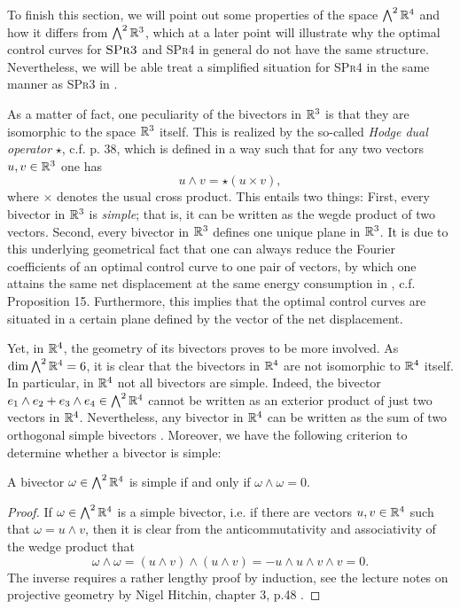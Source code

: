 To finish this section, we will point out some properties of the space $\bigwedge^2 \mathbb{R}^4$ and how it differs from $\bigwedge^2 \mathbb{R}^3$, which at a later point will illustrate why the optimal control curves for $\textsc{SPr3}$ and \textsc{SPr4} in general do not have the same structure. Nevertheless, we will be able treat a simplified situation for \textsc{SPr4} in the same manner as \textsc{SPr3} in \cite{Alouges2017}.

As a matter of fact, one peculiarity of the bivectors in $\mathbb{R}^3$ is that they are isomorphic to the space $\mathbb{R}^3$ itself. This is realized by the so-called \emph{Hodge dual operator} $\star$, c.f. \cite{Lounesto2006} p. 38, which is defined in a way such that for any two vectors $u,v \in \mathbb{R}^3$ one has
\begin{equation}
\label{eq: hodge star}
u \wedge v = \star(u \times v),
\end{equation}
where $\times$ denotes the usual cross product. This entails two things: First, every bivector in $\mathbb{R}^3$ is \emph{simple}; that is, it can be written as the wegde product of two vectors. Second, every bivector in $\mathbb{R}^3$ defines one unique plane in $\mathbb{R}^3$. It is due to this underlying geometrical fact that one can always reduce the Fourier coefficients of an optimal control curve to one pair of vectors, by which one attains the same net displacement at the same energy consumption in \cite{Alouges2017}, c.f. Proposition 15. Furthermore, this implies that the optimal control curves are situated in a certain plane defined by the vector of the net displacement.

Yet, in $\mathbb{R}^4$, the geometry of its bivectors proves to be more involved. As $\dim \bigwedge^2 \mathbb{R}^4 = 6$, it is clear that the bivectors in $\mathbb{R}^4$ are not isomorphic to $\mathbb{R}^4$ itself. In particular, in $\mathbb{R}^4$ not all bivectors are simple. Indeed, the bivector $e_1 \wedge e_2 + e_3 \wedge e_4 \in \bigwedge^2 \mathbb{R}^4$ cannot be written as an exterior product of just two vectors in $\mathbb{R}^4$. Nevertheless, any bivector in $\mathbb{R}^4$ can be written as the sum of two orthogonal simple bivectors \cite{Lounesto2006}. Moreover, we have the following criterion to determine whether a bivector is simple:

\newpage

\begin{lemma}
\label{lem:simple bivector}
A bivector $\omega \in \bigwedge^2 \mathbb{R}^4$ is simple if and only if $\omega \wedge \omega = 0$.
\end{lemma}

\begin{proof}
If $\omega \in \bigwedge^2 \mathbb{R}^4$ is a simple bivector, i.e. if there are vectors $u,v \in \mathbb{R}^4$ such that $\omega = u \wedge v$, then it is clear from the anticommutativity and associativity of the wedge product that
\begin{equation}
\omega \wedge \omega = (u \wedge v) \wedge (u \wedge v) = - u \wedge u \wedge v \wedge v = 0.
\end{equation}
The inverse requires a rather lengthy proof by induction, see the lecture notes on projective geometry by Nigel Hitchin, chapter 3, p.48 \cite{Hitchin2003}.
\end{proof}


